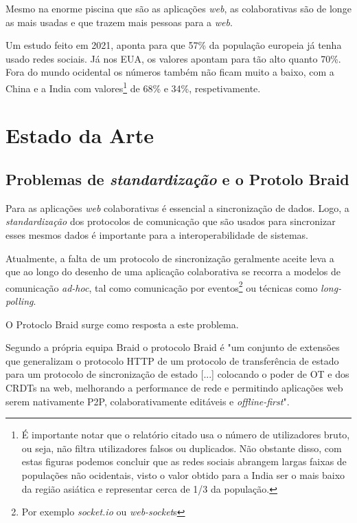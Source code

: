 \documentclass[runningheads]{llncs}
\begin{document}
        Mesmo na enorme piscina que são as aplicações {\itshape web}, as
        colaborativas são de longe as mais usadas e que trazem mais pessoas para
        a {\itshape web}.

        Um estudo feito em 2021, aponta para que
        57\%\cite{eurostat-soc-media-usage} da população europeia já tenha usado
        redes sociais. Já nos EUA, os valores apontam para tão alto quanto
        70\%\cite{usa-soc-media-usage}. Fora do mundo ocidental os números
        também não ficam muito a baixo, com a China e a India com
        valores\footnote{É importante notar que o relatório citado usa o número
        de utilizadores bruto, ou seja, não filtra utilizadores falsos ou
        duplicados. Não obstante disso, com estas figuras podemos concluir que
        as redes sociais abrangem largas faixas de populações não ocidentais,
        visto o valor obtido para a India ser o mais baixo da região asiática e
        representar cerca de 1/3 da população.} de 68\% e 34\%,
        respetivamente\cite{digital2022}. 
        

    \section{Estado da Arte}

        \subsection{Problemas de {\itshape standardização} e o Protolo Braid}

        Para as aplicações {\itshape web} colaborativas é essencial a
        sincronização de dados. Logo, a {\itshape standardização} dos protocolos
        de comunicação que são usados para sincronizar esses mesmos dados é
        importante para a interoperabilidade de sistemas. 

        Atualmente, a falta de um protocolo de sincronização geralmente aceite
        leva a que ao longo do desenho de uma aplicação colaborativa se recorra
        a modelos de comunicação {\itshape ad-hoc}, tal como comunicação por
        eventos\footnote{Por exemplo {\itshape socket.io} ou {\itshape
        web-socket}s} ou técnicas como {\itshape long-polling}. 

        O Protoclo Braid surge como resposta a este problema.
            
        Segundo a própria equipa Braid o protocolo Braid é "um conjunto de
        extensões que generalizam o protocolo HTTP de um protocolo de
        transferência de estado para um protocolo de sincronização de estado
        [...] colocando o poder de OT e dos CRDTs na web, melhorando a
        performance de rede e permitindo aplicações web serem nativamente
        P2P, colaborativamente editáveis e {\itshape
        offline-first}"\cite{braid-spec}. 
\end{document}
